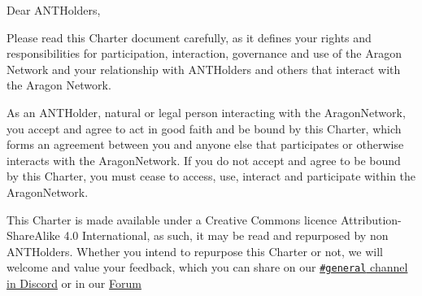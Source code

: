 
\label{chap:Introduction}

Dear \glspl{ANTHolder},

Please read this Charter document carefully, as it defines your rights and responsibilities for participation, interaction, governance and use of the Aragon Network and your relationship with \glspl{ANTHolder} and others that interact with the Aragon Network.

As an \gls{ANTHolder}, natural or legal person interacting with the \gls{AragonNetwork}, you accept and agree to act in good faith and be bound by this Charter, which forms an agreement between you and anyone else that participates or otherwise interacts with the \gls{AragonNetwork}.
If you do not accept and agree to be bound by this Charter, you must cease to access, use, interact and participate within the \gls{AragonNetwork}.

This Charter is made available under a Creative Commons licence Attribution-Share\-Alike 4.0 International, as such, it may be read and repurposed by non \glspl{ANTHolder}.
Whether you intend to repurpose this Charter or not, we will welcome and value your feedback, which you can share on our \href{https://discord.com/invite/eqQJkdp}{\texttt{\#general} channel in Discord} or in our \href{https://forum.aragon.org/}{Forum} 


